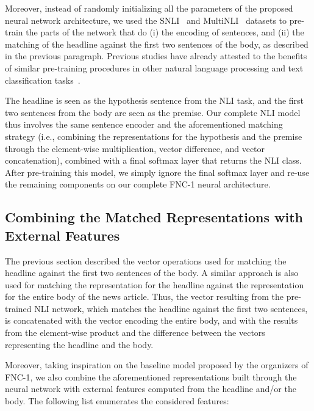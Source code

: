 Moreover, instead of randomly initializing all the parameters of the proposed neural network architecture, we used the SNLI~\cite{snli} and MultiNLI~\cite{inference} datasets to pre-train the parts of the network that do (i) the encoding of sentences, and (ii) the matching of the headline against the first two sentences of the body, as described in the previous paragraph. Previous studies have already attested to the benefits of similar pre-training procedures in other natural language processing and text classification tasks~\cite{supervised}.

The headline is seen as the hypothesis sentence from the NLI task, and the first two sentences from the body are seen as the premise. Our complete NLI model thus involves the same  sentence encoder and the aforementioned matching strategy (i.e., combining the representations for the hypothesis and the premise through the element-wise multiplication, vector difference, and vector concatenation), combined with a final softmax layer that returns the NLI class. After pre-training this model, we simply ignore the final softmax layer and re-use the remaining components on our complete FNC-1 neural architecture.

\subsection{Combining the Matched Representations with External Features}

The previous section described the vector operations used for matching the headline against the first two sentences of the body. A similar approach is also used for matching the representation for the  headline against the representation for the entire body of the news article. Thus, the vector resulting from the pre-trained NLI network, which matches the headline against the first two sentences, is concatenated with the vector encoding the entire body, and with the results from the element-wise product and the difference between the vectors representing the headline and the body.

Moreover, taking inspiration on the baseline model proposed by the organizers of FNC-1, we also combine the aforementioned representations built through the neural network with external features computed from the headline and/or the body. The following list enumerates the considered features:

